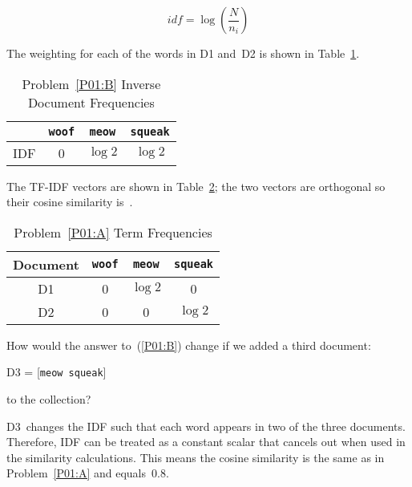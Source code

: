 \begin{equation}\label{eq:P01:IDF}
  idf = \log \left( \frac{N}{n_i} \right)
\end{equation}

\noindent
The weighting for each of the words in D1 and~D2 is shown in Table~\ref{tab:P01:IDF}.

  \begin{table}[h]
    \centering
    \caption{Problem~\ref{P01:B} Inverse Document Frequencies}\label{tab:P01:IDF}
    \begin{tabular}{|c|c|c|c|}
      \hline
          & \texttt{woof} & \texttt{meow}  & \texttt{squeak} \\\hline\hline
      IDF & 0             & $\log 2$       & $\log 2$ \\\hline
    \end{tabular}
  \end{table}

\noindent
The TF-IDF vectors are shown in Table~\ref{tab:P01:TFIDF}; the two vectors are orthogonal so their cosine similarity is~.

  \begin{table}[h]
    \centering
    \caption{Problem~\ref{P01:A} Term Frequencies}\label{tab:P01:TFIDF}
    \begin{tabular}{|c|c|c|c|}
      \hline
      \textbf{Document} & \texttt{woof} & \texttt{meow} & \texttt{squeak} \\\hline\hline
      D1                & 0             & $\log 2$      & 0 \\\hline
      D2                & 0             & 0             & $\log 2$ \\\hline
    \end{tabular}
  \end{table}

\begin{subproblem}\label{P01:C}
   How would the answer to~(\ref{P01:B}) change if we added a third document:

  D3 = [\texttt{meow squeak}]

  \noindent
  to the collection?
\end{subproblem}

D3~changes the IDF such that each word appears in two of the three documents.  Therefore, IDF can be treated as a constant scalar that cancels out when used in the similarity calculations.  This means the cosine similarity is the same as in Problem~\ref{P01:A} and equals~$\boxed{0.8}$.
